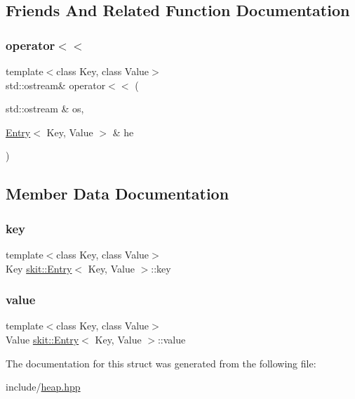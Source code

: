 \subsection{Friends And Related Function Documentation}
\mbox{\label{structskit_1_1Entry_a885f1645de32df3dbfbf9f2f47f7ea1f}} 
\subsubsection{\texorpdfstring{operator$<$$<$}{operator<<}}
{\footnotesize\ttfamily template$<$class Key, class Value$>$ \\
std\+::ostream\& operator$<$$<$ (\begin{DoxyParamCaption}\item[{std\+::ostream \&}]{os,  }\item[{\hyperlink{structskit_1_1Entry}{Entry}$<$ Key, Value $>$ \&}]{he }\end{DoxyParamCaption})\hspace{0.3cm}{\ttfamily [friend]}}



\subsection{Member Data Documentation}
\mbox{\label{structskit_1_1Entry_a85d35e3246296b58e47330df3c18736a}} 
\subsubsection{\texorpdfstring{key}{key}}
{\footnotesize\ttfamily template$<$class Key, class Value$>$ \\
Key \hyperlink{structskit_1_1Entry}{skit\+::\+Entry}$<$ Key, Value $>$\+::key}

\mbox{\label{structskit_1_1Entry_aa1897a9b4bad03738812728966e4609c}} 
\subsubsection{\texorpdfstring{value}{value}}
{\footnotesize\ttfamily template$<$class Key, class Value$>$ \\
Value \hyperlink{structskit_1_1Entry}{skit\+::\+Entry}$<$ Key, Value $>$\+::value}



The documentation for this struct was generated from the following file\+:\begin{DoxyCompactItemize}
\item 
include/\hyperlink{heap_8hpp}{heap.\+hpp}\end{DoxyCompactItemize}
